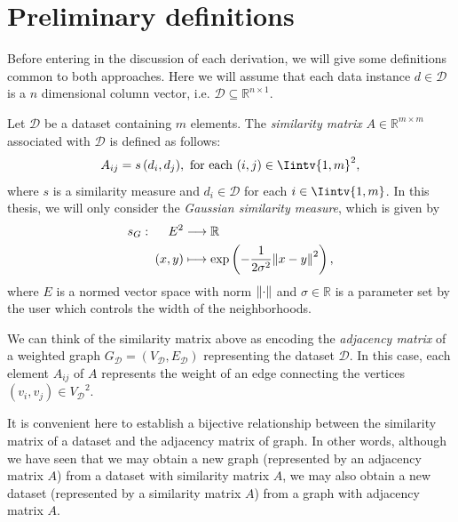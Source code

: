 \section{Preliminary definitions} 
Before entering in the discussion of each derivation, we will give some definitions common to both approaches.
Here we will assume that each data instance $d \in \mathcal D$ is a $n$ dimensional column vector, i.e. $\mathcal D \subseteq \mathbb R^{n \times 1}$.

\begin{definition}
   Let $\mathcal D$ be a dataset containing $m$ elements. The \textit{similarity matrix} $A \in \mathbb{R}^{m \times m}$ associated with $\mathcal D$ is defined as follows: 
   \begin{equation}
      A_{ij} = s\,(d_i,d_j), \text{ for each } (i,j) \in \Iintv{1,m}^2,
   \end{equation}
   where $s$ is a similarity measure and $d_i \in \mathcal D$ for each $i \in \Iintv{1,m}$.
   In this thesis, we will only consider the \textit{Gaussian similarity measure}, which is given by 
   \begin{equation}
      \begin{split}
         s_G:\,\,\,\,\,\,\,\,   E^2  &\longrightarrow \mathbb R  \\
          (x, y) & \longmapsto \exp \left( -\frac{1}{2 \sigma ^2} {\left\lVert x - y\right\rVert}^2 \right),
      \end{split}
   \end{equation}
   where $E$ is a normed vector space with norm $\left\lVert\cdot\right\rVert$ and $\sigma \in \mathbb R$ is a parameter set by the user which controls the width of the neighborhoods.
\end{definition}

We can think of the similarity matrix above as encoding the \textit{adjacency matrix} of a weighted graph $G_{\mathcal D} = (V_{\mathcal D}, E_{\mathcal D})$ representing the dataset $\mathcal D$. 
In this case, each element $A_{ij}$ of $A$ represents the weight of an edge connecting the vertices $(v_i, v_j) \in {V_{\mathcal D}}^2$.
\begin{remark}
It is convenient here to establish a bijective relationship between the similarity matrix of a dataset and the adjacency matrix of graph.
   In other words, although we have seen that we may obtain a new graph (represented by an adjacency matrix $A$) from a dataset with similarity matrix $A$, we may also obtain a new dataset (represented by a similarity matrix $A$) from a graph with adjacency matrix $A$.
\end{remark}

